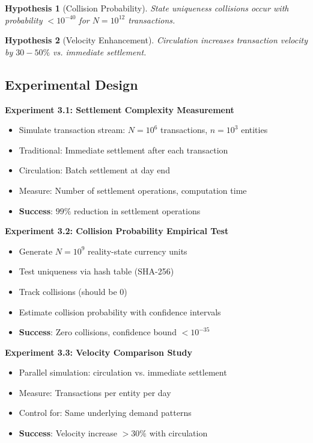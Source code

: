 \documentclass[12pt]{article}
\newtheorem{hypothesis}{Hypothesis}
\begin{document}
\begin{hypothesis}[Collision Probability]
State uniqueness collisions occur with probability $< 10^{-40}$ for $N=10^{12}$ transactions.
\end{hypothesis}

\begin{hypothesis}[Velocity Enhancement]
Circulation increases transaction velocity by $30-50\%$ vs. immediate settlement.
\end{hypothesis}

\subsection{Experimental Design}

\textbf{Experiment 3.1: Settlement Complexity Measurement}
\begin{itemize}
    \item Simulate transaction stream: $N = 10^6$ transactions, $n=10^3$ entities
    \item Traditional: Immediate settlement after each transaction
    \item Circulation: Batch settlement at day end
    \item Measure: Number of settlement operations, computation time
    \item \textbf{Success}: $99\%$ reduction in settlement operations
\end{itemize}

\textbf{Experiment 3.2: Collision Probability Empirical Test}
\begin{itemize}
    \item Generate $N=10^{9}$ reality-state currency units
    \item Test uniqueness via hash table (SHA-256)
    \item Track collisions (should be 0)
    \item Estimate collision probability with confidence intervals
    \item \textbf{Success}: Zero collisions, confidence bound $< 10^{-35}$
\end{itemize}

\textbf{Experiment 3.3: Velocity Comparison Study}
\begin{itemize}
    \item Parallel simulation: circulation vs. immediate settlement
    \item Measure: Transactions per entity per day
    \item Control for: Same underlying demand patterns
    \item \textbf{Success}: Velocity increase $> 30\%$ with circulation
\end{itemize}
\end{document}
